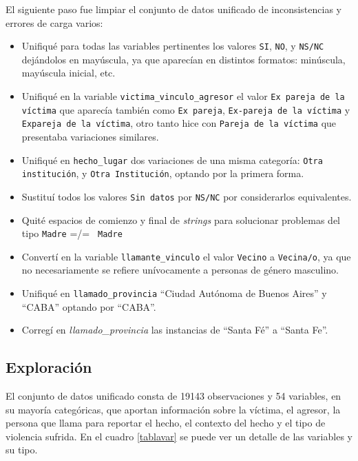 \documentclass[10 pt]{article}
\begin{document}
El siguiente paso fue limpiar el conjunto de datos unificado de inconsistencias y errores de carga varios: 
\begin{itemize}
    \item Unifiqué para todas las variables pertinentes los valores \texttt{SI}, \texttt{NO}, y \texttt{NS/NC} dejándolos en mayúscula, ya que aparecían en distintos formatos: minúscula, mayúscula inicial, etc.
    \item Unifiqué en la variable \texttt{victima\_vinculo\_agresor} el valor \texttt{Ex pareja de la víctima} que aparecía también como \texttt{Ex pareja}, \texttt{Ex-pareja de la víctima} y \texttt{Expareja de la víctima}, otro tanto hice con \texttt{Pareja de la víctima} que presentaba variaciones similares.
    \item Unifiqué en \texttt{hecho\_lugar} dos variaciones de una misma categoría: \texttt{Otra institución}, y \texttt{Otra Institución}, optando por la primera forma.
    \item Sustituí todos los valores \texttt{Sin datos} por \texttt{NS/NC} por considerarlos equivalentes.
    \item Quité espacios de comienzo y final de \textit{strings} para solucionar problemas del tipo \texttt{Madre} =/= \texttt{  Madre} 
    \item Convertí en la variable \texttt{llamante\_vinculo} el valor \texttt{Vecino} a \texttt{Vecina/o}, ya que no necesariamente se refiere unívocamente a personas de género masculino.
    \item Unifiqué en \texttt{llamado\_provincia} “Ciudad Autónoma de Buenos Aires” y “CABA” optando por “CABA”. 
    \item Corregí en \textit{llamado\_provincia }las instancias de “Santa Fé” a “Santa Fe”.

\end{itemize}

\subsection{Exploración}\label{exploración}

El conjunto de datos unificado consta de 19143 observaciones y 54 variables, en su mayoría categóricas, que aportan información sobre la víctima, el agresor, la persona que llama para reportar el hecho, el contexto del hecho y el tipo de violencia sufrida. En el cuadro \ref{tablavar} se puede ver un detalle de las variables y su tipo.
\end{document}
